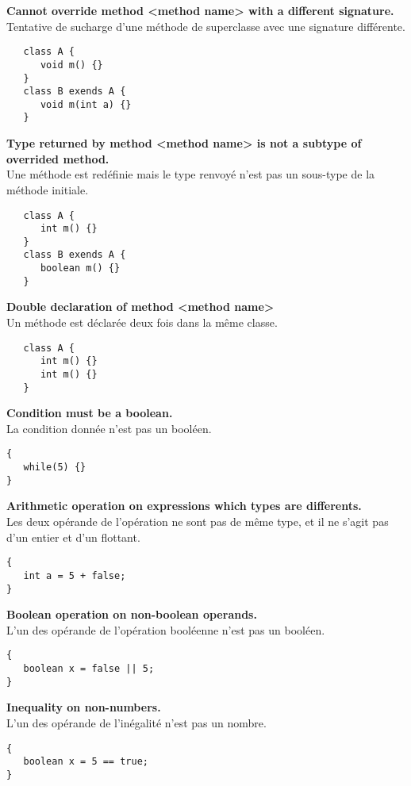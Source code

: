 \documentclass[a4,12pt]{article}
\begin{document}
\textbf{Cannot override method <method name> with a different signature.} \\
Tentative de sucharge d'une méthode de superclasse avec une signature différente.
\begin{lstlisting}
   class A {
      void m() {}
   }
   class B exends A {
      void m(int a) {}
   }
\end{lstlisting}



\textbf{Type returned by method <method name> is not a subtype of overrided method.}\\
Une méthode est redéfinie mais le type renvoyé n'est pas un sous-type de la méthode initiale.
\begin{lstlisting}
   class A {
      int m() {}
   }
   class B exends A {
      boolean m() {}
   }
\end{lstlisting}



\textbf{Double declaration of method <method name>}\\
Un méthode est déclarée deux fois dans la même classe.
\begin{lstlisting}
   class A {
      int m() {}
      int m() {}
   }
\end{lstlisting}



\textbf{Condition must be a boolean.}\\
La condition donnée n'est pas un booléen.
\begin{lstlisting}
{
   while(5) {}
}
\end{lstlisting}



\textbf{Arithmetic operation on expressions which types are differents.}\\
Les deux opérande de l'opération ne sont pas de même type, et il ne s'agit pas d'un entier et d'un flottant.
\begin{lstlisting}
{
   int a = 5 + false;
}
\end{lstlisting}



\textbf{Boolean operation on non-boolean operands.}\\
L'un des opérande de l'opération booléenne n'est pas un booléen.
\begin{lstlisting}
{
   boolean x = false || 5;
}
\end{lstlisting}



\textbf{Inequality on non-numbers.}\\
L'un des opérande de l'inégalité n'est pas un nombre.
\begin{lstlisting}
{
   boolean x = 5 == true;
}
\end{lstlisting}
\end{document}
